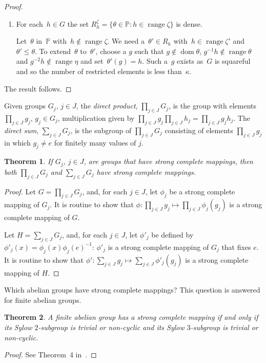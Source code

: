 \documentclass[12pt,a4paper]{article}
\newtheorem{thm}{Theorem}[section]
\DeclareMathOperator{\dom}{dom}
\DeclareMathOperator{\ran}{range}
\renewcommand{\P}{\mathbb{P}}
\begin{document}
\begin{proof}
\begin{enumerate}
\item For each~$h \in G$ the set  $R_h^{\zeta} = \{ \theta \in \P : h \in \ran \zeta \}$ is dense.

Let~$\theta$ in~$\P$ with~$h \not\in \ran \zeta$.  We need a~$\theta' \in R_h$ with~$h \in \ran \zeta'$ and $\theta' \leq \theta$.
To extend~$\theta$ to~$\theta'$,  choose a $g$ such that $g \not\in \dom \theta$, $g^{-1}h \not\in \ran \theta$ and $g^{-2}h \not\in \ran \eta$ and set~$\theta'(g) = h$.  Such a~$g$ exists as~$G$ is squareful and so the number of restricted elements is less than~$\kappa$.
\end{enumerate}

The result follows.
\end{proof}

Given groups $G_j$, $j\in J$, the {\em direct product}, $\prod_{j\in J}G_j$, is the group with elements $\prod_{j\in J}g_j$, $g_j\in G_j$, multiplication given by $\prod_{j\in J}g_j\prod_{j\in J}h_j=\prod_{j\in J}g_jh_j$. The {\em direct sum}, $\sum_{j\in J}G_j$, is the subgroup of $\prod_{j\in J}G_j$ consisting of elements $\prod_{j\in J}g_j$ in which $g_j\ne e$ for finitely many values of $j$. 

\begin{thm}\label{thm:direct}
If $G_j$, $j\in J$, are groups that have strong complete mappings, then both $\prod_{j\in J}G_j$ and $\sum_{j\in J}G_j$ have strong complete mappings.
\end{thm}
\begin{proof}
Let $G=\prod_{j\in J}G_j$, and, for each $j\in J$, let $\phi_j$ be a strong complete mapping of $G_j$. It is routine to show that $\phi\colon \prod_{j\in J}g_j\mapsto \prod_{j\in J}\phi_j(g_j)$ is a strong complete mapping of $G$.
 
Let $H=\sum_{j\in J}G_j$, and, for each $j\in J$, let $\phi'_j$ be defined by $\phi'_j(x)=\phi_j(x)\phi_j(e)^{-1}$: $\phi'_j$ is a strong complete mapping of $G_j$ that fixes $e$. It is routine to show that $\phi'\colon \sum_{j\in J}g_j\mapsto \sum_{j\in J}\phi'_j(g_j)$ is a strong complete mapping of $H$.
\end{proof}

Which abelian groups have strong complete mappings? This question is answered for finite abelian groups. 

\begin{thm}\label{thm:finite2gps}
A finite abelian  group has a strong complete mapping if and only if its Sylow $2$-subgroup is trivial or non-cyclic and its Sylow $3$-subgroup is trivial or non-cyclic.
\end{thm}
\begin{proof}
See Theorem~4 in~\cite{Evans12}.
\end{proof}
\end{document}
